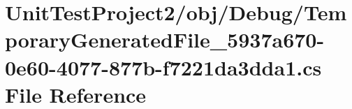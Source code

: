 \hypertarget{_unit_test_project2_2obj_2_debug_2_temporary_generated_file__5937a670-0e60-4077-877b-f7221da3dda1_8cs}{}\section{Unit\+Test\+Project2/obj/\+Debug/\+Temporary\+Generated\+File\+\_\+5937a670-\/0e60-\/4077-\/877b-\/f7221da3dda1.cs File Reference}
\label{_unit_test_project2_2obj_2_debug_2_temporary_generated_file__5937a670-0e60-4077-877b-f7221da3dda1_8cs}
